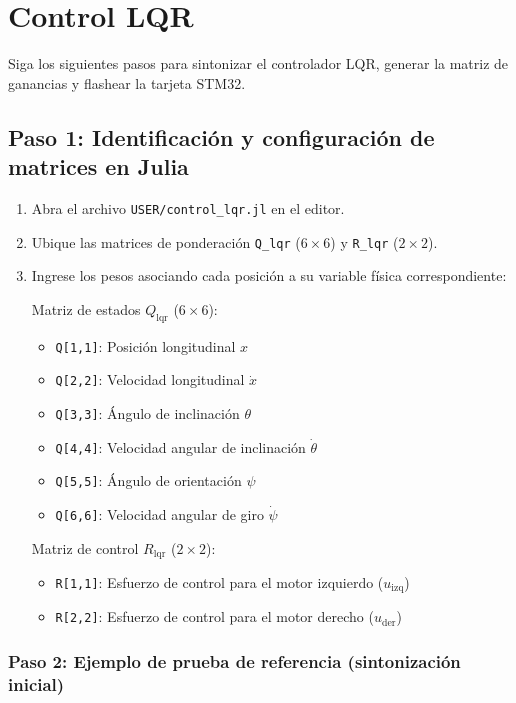 \section{Control LQR}

Siga los siguientes pasos para sintonizar el controlador LQR, generar la matriz de ganancias y flashear la tarjeta STM32.

\subsection*{Paso 1: Identificación y configuración de matrices en Julia}

\begin{enumerate}
	\item Abra el archivo \texttt{USER/control\_lqr.jl} en el editor.
	\item Ubique las matrices de ponderación \texttt{Q\_lqr} ($6 \times 6$) y \texttt{R\_lqr} ($2 \times 2$).
	\item Ingrese los pesos asociando cada posición a su variable física correspondiente:
	
	Matriz de estados $Q_{\text{lqr}}$ ($6 \times 6$):
	\begin{itemize}
		\item \texttt{Q[1,1]}: Posición longitudinal $x$
		\item \texttt{Q[2,2]}: Velocidad longitudinal $\dot{x}$
		\item \texttt{Q[3,3]}: Ángulo de inclinación $\theta$
		\item \texttt{Q[4,4]}: Velocidad angular de inclinación $\dot{\theta}$
		\item \texttt{Q[5,5]}: Ángulo de orientación $\psi$
		\item \texttt{Q[6,6]}: Velocidad angular de giro $\dot{\psi}$
	\end{itemize}
	
	Matriz de control $R_{\text{lqr}}$ ($2 \times 2$):
	\begin{itemize}
		\item \texttt{R[1,1]}: Esfuerzo de control para el motor izquierdo ($u_{\text{izq}}$)
		\item \texttt{R[2,2]}: Esfuerzo de control para el motor derecho ($u_{\text{der}}$)
	\end{itemize}
\end{enumerate}

\subsubsection*{Paso 2: Ejemplo de prueba de referencia (sintonización inicial)}

